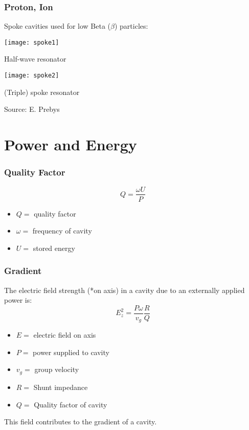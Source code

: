 \documentclass[professionalfonts,t]{beamer}
\begin{document}
\begin{frame}
\frametitle{Proton, Ion}
Spoke cavities used for low Beta ($\beta$) particles:
\vspace{0.25em}

\centering
\begin{minipage}{0.45\textwidth}
	\centering
	\texttt{[image: spoke1]}
	
	Half-wave resonator
\end{minipage}\hspace{-1em}
\begin{minipage}{0.5\textwidth}
	\centering
	\texttt{[image: spoke2]}
	
	(Triple) spoke resonator
\end{minipage}

\vspace{1em}
\hfill Source: E. Prebys
\end{frame}



\section{Power and Energy }
\begin{frame}
	\frametitle{Quality Factor}
	\begin{equation}
		Q= \frac{\omega U}{P}
	\end{equation}
	\begin{itemize}
		\item $Q =$ quality factor
		\item $\omega =$ frequency of cavity
		\item $U =$ stored energy
	\end{itemize}
\end{frame}

\begin{frame}
	\frametitle{Gradient}
	The electric field strength (*on axis) in a cavity 
	due to an externally applied power is:
	\begin{equation}
		E^2_z = \frac{P\omega}{v_g} \frac{R}{Q}
	\end{equation}
	\begin{itemize}
		\item $E =$ electric field on axis
		\item $P =$ power supplied to cavity
		\item $v_g =$ group velocity
		\item $R =$ Shunt impedance 
		\item $Q =$ Quality factor of cavity
	\end{itemize}

\vspace{0.5em}
This field contributes to the gradient of a cavity.
\end{frame}
\end{document}
